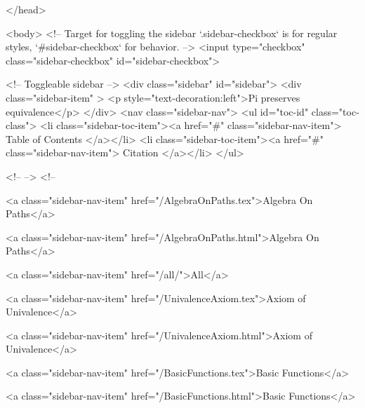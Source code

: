  
</head>




  <body>
    <!-- Target for toggling the sidebar `.sidebar-checkbox` is for regular
     styles, `#sidebar-checkbox` for behavior. -->
<input type="checkbox" class="sidebar-checkbox" id="sidebar-checkbox">

<!-- Toggleable sidebar -->
<div class="sidebar" id="sidebar">
  <div class="sidebar-item" >
    <p style="text-decoration:left">Pi preserves equivalence</p>
  </div>
  <nav class="sidebar-nav">
    <ul id="toc-id" class="toc-class">
  <li class="sidebar-toc-item"><a href="#" class="sidebar-nav-item"> Table of Contents </a></li>
  <li class="sidebar-toc-item"><a href="#" class="sidebar-nav-item"> Citation </a></li>
</ul>


    <!--  -->
    <!-- 
      
    
      
    
      
    
      
        
      
    
      
        
          <a class="sidebar-nav-item" href="/AlgebraOnPaths.tex">Algebra On Paths</a>
        
      
    
      
        
          <a class="sidebar-nav-item" href="/AlgebraOnPaths.html">Algebra On Paths</a>
        
      
    
      
        
          <a class="sidebar-nav-item" href="/all/">All</a>
        
      
    
      
        
          <a class="sidebar-nav-item" href="/UnivalenceAxiom.tex">Axiom of Univalence</a>
        
      
    
      
        
          <a class="sidebar-nav-item" href="/UnivalenceAxiom.html">Axiom of Univalence</a>
        
      
    
      
        
          <a class="sidebar-nav-item" href="/BasicFunctions.tex">Basic Functions</a>
        
      
    
      
        
          <a class="sidebar-nav-item" href="/BasicFunctions.html">Basic Functions</a>
        
